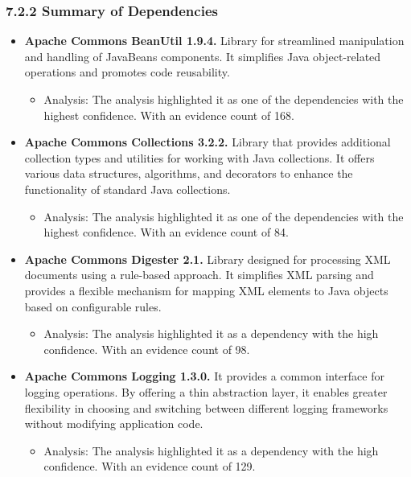 \documentclass{sigchi}
\begin{document}
\subsubsection{\textbf{7.2.2 Summary of Dependencies}}
\begin{itemize}
    \item \textbf{Apache Commons BeanUtil 1.9.4.} Library for streamlined manipulation and handling of JavaBeans components. It simplifies Java object-related operations and promotes code reusability.
    \begin{itemize}
        \item Analysis: The analysis highlighted it as one of the dependencies with the highest confidence. With an evidence count of 168.
    \end{itemize}
    
    \item \textbf{Apache Commons Collections 3.2.2.} Library that provides additional collection types and utilities for working with Java collections. It offers various data structures, algorithms, and decorators to enhance the functionality of standard Java collections.
    \begin{itemize}
        \item Analysis: The analysis highlighted it as one of the dependencies with the highest confidence. With an evidence count of 84.
    \end{itemize}
    \item \textbf{Apache Commons Digester 2.1.} Library designed for processing XML documents using a rule-based approach. It simplifies XML parsing and provides a flexible mechanism for mapping XML elements to Java objects based on configurable rules.
    \begin{itemize}
        \item Analysis: The analysis highlighted it as a dependency with the high confidence. With an evidence count of 98.
    \end{itemize}
    \item \textbf{Apache Commons Logging 1.3.0.} It provides a common interface for logging operations. By offering a thin abstraction layer, it enables greater flexibility in choosing and switching between different logging frameworks without modifying application code.
    \begin{itemize}
        \item Analysis: The analysis highlighted it as a dependency with the high confidence. With an evidence count of 129.
    \end{itemize}

\end{itemize}
\end{document}
